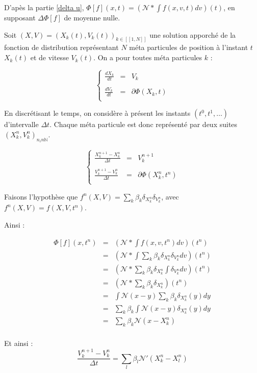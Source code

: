 \documentclass[a4paper,11pt]{article}
\begin{document}
D'apès la partie \ref{delta u}, $\Phi[f](x,t) = (\mathcal{N} \ast \int f(x,v,t)dv) (t)$, en supposant $\Delta \Phi [f]$ de moyenne nulle.

Soit $(X,V) = (X_k(t),V_k(t))_{k \in [\![ 1, N]\!]}$ une solution apporché de la fonction de distribution représentant $N$ méta particules de position à l'instant $t$ $X_k(t)$ et de vitesse $V_k(t)$. On a pour toutes méta particules $k$ :

$$
\left\lbrace
\begin{array}{rcl}

\frac{dX_k}{dt} &=& V_k \\ \\
\frac{dV_k}{dt} &=& \partial \Phi(X_k, t) \\

\end{array} \right.
$$

En discrétisant le temps, on considère à présent les instants $(t^0, t^1, \dots)$ d'intervalle $\Delta t$. Chaque méta particule est donc représenté par deux suites $(X_k^n, V_k^n)_{n _in \mathbb{N}}$.

$$
\left\lbrace
\begin{array}{rcl}

\frac{X_k^{n+1} - X_k^n}{\Delta t} &=& V_k^{n+1} \\ \\
\frac{V_k^{n+1} - V_k^n}{\Delta t} &=& \partial \Phi (X_k^n , t^n)\\

\end{array} \right.
$$

Faisons l'hypothèse que $f^n(X,V) = \sum\limits_k \beta_k \delta_{X_k^n} \delta_{ V_k^n}$, avec $f^n(X,V) = f(X,V, t^n)$.

Ainsi :

$$
\begin{array}{rcl}

\Phi[f](x,t^n) &=& (\mathcal{N} \ast \int f(x,v,t^n)dv) (t^n) \\
	&=& (\mathcal{N} \ast \int \sum\limits_k \beta_k \delta_{X_k^n} \delta_{ V_k^n}dv) (t^n) \\
	&=& (\mathcal{N} \ast \sum\limits_k \beta_k \delta_{X_k^n} \int \delta_{ V_k^n}dv) (t^n) \\
	&=& (\mathcal{N} \ast \sum\limits_k \beta_k \delta_{X_k^n}) (t^n) \\
	&=& \int \mathcal{N}(x-y) \sum\limits_k \beta_k \delta_{X_k^n}(y) dy \\
	&=& \sum\limits_k \beta_k  \int \mathcal{N}(x-y) \delta_{X_k^n}(y) dy \\
	&=& \sum\limits_k \beta_k  \mathcal{N}(x-X_k^n) \\

\end{array}
$$

Et ainsi : 
$$
\frac{V_k^{n+1} - V_k^n}{\Delta t} = \sum\limits_l \beta_l  \mathcal{N}'(X_k^n-X_l^n)
$$
\end{document}

